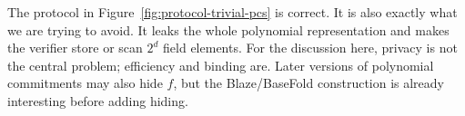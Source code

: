 The protocol in Figure~\ref{fig:protocol-trivial-pcs} is correct.  It is also
exactly what we are trying to avoid.  It leaks the whole polynomial
representation and makes the verifier store or scan \(2^d\) field elements.  For
the discussion here, privacy is not the central problem; efficiency and binding
are.  Later versions of polynomial commitments may also hide $f$, but the
Blaze/BaseFold construction is already interesting before adding hiding.
